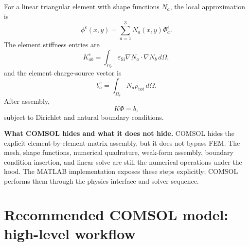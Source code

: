 \documentclass[11pt]{article}
\newcommand{\epss}{\varepsilon_{\mathrm{Si}}}
\newcommand{\rhotot}{\rho_{\mathrm{tot}}}
\begin{document}
For a linear triangular element with shape functions $N_a$, the local approximation is
\begin{equation}
\phi^e(x,y)=\sum_{a=1}^3 N_a(x,y)\Phi_a^e.
\end{equation}
The element stiffness entries are
\begin{equation}
K^e_{ab}=\int_{\Omega_e}\epss\nabla N_a\cdot\nabla N_b\,d\Omega,
\label{eq:ke_comsol}
\end{equation}
and the element charge-source vector is
\begin{equation}
b^e_a=\int_{\Omega_e}N_a\rhotot\,d\Omega.
\label{eq:be_comsol}
\end{equation}
After assembly,
\begin{equation}
K\Phi=b,
\end{equation}
subject to Dirichlet and natural boundary conditions.

\begin{notebox}
\textbf{What COMSOL hides and what it does not hide.} COMSOL hides the explicit element-by-element matrix assembly, but it does not bypass FEM. The mesh, shape functions, numerical quadrature, weak-form assembly, boundary condition insertion, and linear solve are still the numerical operations under the hood. The MATLAB implementation exposes these steps explicitly; COMSOL performs them through the physics interface and solver sequence.
\end{notebox}

\section{Recommended COMSOL model: high-level workflow}
\end{document}

